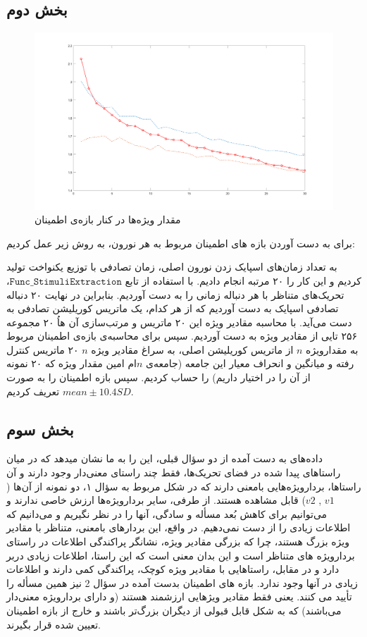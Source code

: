 \documentclass[12pt,onecolumn,a4paper,fleqn]{article}
\newcommand{\pf}[1]{$\mathtt{#1}$}
\begin{document}
\subsection{بخش دوم}

\begin{figure}[ht]
	\centering
	\includegraphics[width=0.6\linewidth]{photos/4_2.png}
	\caption{مقدار ویژه‌ها در کنار بازه‌ی اطمینان }
\end{figure}
برای به دست آوردن بازه های اطمینان مربوط به هر نورون، به روش زیر عمل کردیم:

به تعداد زمان‌های اسپایک زدن نورون اصلی، زمان تصادفی با توزیع یکنواخت تولید کردیم و این کار را ۲۰ مرتبه انجام دادیم. با استفاده از تابع \pf{Func\_StimuliExtraction }، تحریک‌های متناظر با هر دنباله زمانی را به دست آوردیم. بنابراین در نهایت ۲۰ دنباله تصادفی اسپایک به دست آوردیم که از هر کدام، یک ماتریس کوریلیشن تصادفی به دست می‌آید. با محاسبه مقادیر ویژه این ۲۰ ماتریس و مرتب‌سازی آن هاُ ۲۰ مجموعه ۲۵۶ تایی از مقادیر ویژه به دست آوردیم. سپس برای محاسبه‌ی بازه‌ی ‌اطمینان مربوط به مقدار‌ویژه $ n $ از ماتریس کوریلیشن اصلی، به سراغ مقادیر ویژه $ n $  ۲۰ ماتریس کنترل رفته و میانگین و انحراف معیار این جامعه (جامعه‌ی $ n  $ام امین مقدار ویژه که ۲۰ نمونه از آن را در اختیار داریم) را حساب کردیم. سپس بازه اطمینان را به صورت $ mean \pm 10.4SD $ تعریف کردیم.

\subsection{بخش سوم}
داده‌های به دست آمده از دو سؤال قبلی، این را به ما نشان میدهد که در میان راستاهای پیدا شده در فضای تحریک‌‌ها، فقط چند راستای معنی‌دار وجود دارند و آن راستاها، بردارویژه‌هایی بامعنی دارند که در شکل مربوط به سؤال ۱، دو نمونه از آن‌ها ($ v1 $ , $ v2 $) قابل مشاهده هستند. از طرفی، سایر بردارویژه‌ها ارزش خاصی ندارند و می‌توانیم برای کاهش بُعد مسأله و سادگی، آنها را در نظر نگیریم و می‌دانیم که اطلاعات زیادی را از دست نمی‌دهیم. در واقع، این بردارهای بامعنی، متناظر با مقادیر ویژه بزرگ هستند، چرا که بزرگی مقادیر ویژه، نشانگر پراکندگی اطلاعات در راستای بردارویژه های متناظر است و این بدان معنی است که این راستا، اطلاعات زیادی دربر دارد و در مقابل، راستاهایی با مقادیر ویژه کوچک، پراکندگی کمی دارند و اطلاعات زیادی در آنها وجود ندارد.
بازه های اطمینان بدست آمده در سؤال 2 نیز همین مسأله را تأیید می کنند. یعنی فقط مقادیر ویژهایی ارزشمند هستند (و دارای بردارویژه معنی‌دار می‌باشند) که به شکل قابل قبولی از دیگران بزرگ‌تر باشند و خارج از بازه اطمینان تعیین شده قرار بگیرند.
\pagebreak
\end{document}

